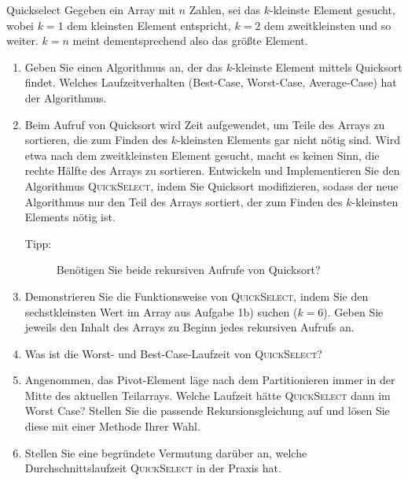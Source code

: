 \documentclass[11pt,a4paper]{article}
\begin{document}
\begin{aufgabe}{5}{\hard Quickselect}
    Gegeben ein Array mit $n$ Zahlen, sei das $k$-kleinste Element gesucht, wobei $k = 1$ dem kleinsten Element entspricht, $k = 2$ dem zweitkleinsten und so weiter.
    $k = n$ meint dementsprechend also das größte Element.
    \begin{enumerate}
        \item Geben Sie einen Algorithmus an, der das $k$-kleinste Element mittels Quicksort findet. Welches Laufzeitverhalten (Best-Case, Worst-Case, Average-Case) hat der Algorithmus.

        \item Beim Aufruf von Quicksort wird Zeit aufgewendet, um Teile des Arrays zu sortieren, die zum Finden des $k$-kleinsten Elements gar nicht nötig sind.
        Wird etwa nach dem zweitkleinsten Element gesucht, macht es keinen Sinn, die rechte Hälfte des Arrays zu sortieren.
        Entwickeln und Implementieren Sie den Algorithmus \textsc{QuickSelect}, indem Sie Quicksort modifizieren, sodass der neue Algorithmus nur den Teil des Arrays sortiert, der zum Finden des $k$-kleinsten Elements nötig ist.
        \begin{description}
            \item[Tipp:] Benötigen Sie beide rekursiven Aufrufe von Quicksort?
        \end{description}

        \item Demonstrieren Sie die Funktionsweise von \textsc{QuickSelect}, indem Sie den sechstkleinsten Wert im Array aus Aufgabe 1b) suchen ($k = 6$). Geben Sie jeweils den Inhalt des Arrays zu Beginn jedes rekursiven Aufrufs an.

        \item Was ist die Worst- und Best-Case-Laufzeit von \textsc{QuickSelect}?

        \item Angenommen, das Pivot-Element läge nach dem Partitionieren immer in der Mitte des aktuellen Teil\-arrays. 
        Welche Laufzeit hätte \textsc{QuickSelect} dann im Worst Case?
        Stellen Sie die passende Rekursionsgleichung auf und lösen Sie diese mit einer Methode Ihrer Wahl.

        \item Stellen Sie eine begründete Vermutung darüber an, welche Durchschnittslaufzeit \textsc{QuickSelect} in der Praxis hat.
    \end{enumerate}
\end{aufgabe}
\end{document}
